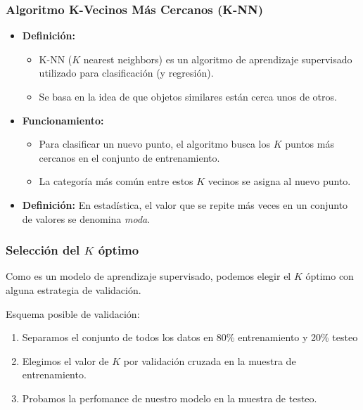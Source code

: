 \documentclass[aspectratio=169,12pt]{beamer}
\begin{document}
\begin{frame}
\frametitle{Algoritmo K-Vecinos Más Cercanos (K-NN)}
\begin{itemize}
    \item \textbf{Definición:}
    \begin{itemize}
        \item K-NN ($K$ nearest neighbors) es un algoritmo de aprendizaje supervisado utilizado para clasificación (y regresión).
        \item Se basa en la idea de que objetos similares están cerca unos de otros.
    \end{itemize}
    \item \textbf{Funcionamiento:}
    \begin{itemize}
        \item Para clasificar un nuevo punto, el algoritmo busca los $K$ puntos más cercanos en el conjunto de entrenamiento.
        \item La categoría más común entre estos $K$ vecinos se asigna al nuevo punto.
    \end{itemize}

    \item \textbf{Definición:} En estadística, el valor que se repite más veces en un conjunto de valores se denomina \emph{moda}.

\end{itemize}
\end{frame}


\begin{frame}
\frametitle{Selección del $K$ óptimo}

Como es un modelo de aprendizaje supervisado, podemos elegir el $K$ óptimo con alguna estrategia de validación.

Esquema posible de validación:

\begin{enumerate}
\item Separamos el conjunto de todos los datos en 80\% entrenamiento y 20\% testeo
\item Elegimos el valor de $K$ por validación cruzada en la muestra de entrenamiento.
\item Probamos la perfomance de nuestro modelo en la muestra de testeo.
\end{enumerate}
\end{frame}

\end{document}
